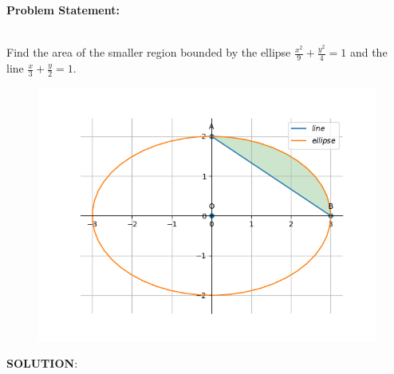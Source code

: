\documentclass[10pt,a4paper]{report}
\begin{document}
\begin{multicols}{2}

\raggedright \textbf{Problem Statement:}\vspace{2mm}
\raggedright \\
\fi
	Find the area of the smaller region bounded by the ellipse $\frac{x^2}{9}+\frac{y^2}{4}=1$
and the line $\frac{x}{3}+\frac{y}{2}=1$.\\
\solution
	\begin{figure}[!h]
		\centering
 \includegraphics[width=\columnwidth]{chapters/12/8/3/8/figs/conic_fig.png}
		\caption{}
		\label{fig:12/8/3/8}
  	\end{figure}
\iffalse
\vspace{5mm}
\raggedright \textbf{SOLUTION}:\vspace{2mm}\\

\end{multicols}
\end{document}

